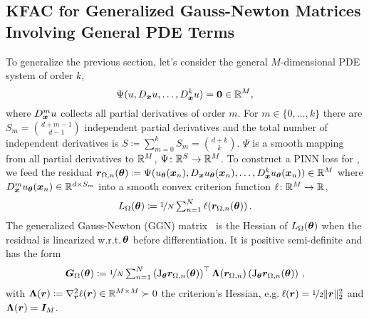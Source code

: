 \subsection{KFAC for Generalized Gauss-Newton Matrices Involving General PDE Terms} \label{sec:KFAC-general}
To generalize the previous section, let's consider the general $M$-dimensional PDE system of order $k$,
\begin{equation}\label{eq:general-pde-system}
  \Psi(u, D_{{\bm{x}}} u, \dots, D^k_{{\bm{x}}} u) = {\bm{0}} \in {\mathbb{R}}^M,
\end{equation}
where $D^m_{\bm{x}} u$ collects all partial derivatives of order $m$.
For $m\in \{0, \dots, k\}$ there are $S_m = \binom{d + m - 1}{d - 1}$ independent partial derivatives and the total number of independent derivatives is $S \coloneqq \sum_{m=0}^k S_{m} = \binom{d + k}{k}$.
$\Psi$ is a smooth mapping from all partial derivatives to ${\mathbb{R}}^M$, $\Psi\colon \mathbb {{\mathbb{R}}}^S\to\mathbb {{\mathbb{R}}}^M$.
To construct a PINN loss for , we feed the residual ${\bm{r}}_{\Omega, n}({\bm{\theta}}) \coloneqq \Psi(u_{{\bm{\theta}}}({\bm{x}}_n), D_{{\bm{x}}} u_{{\bm{\theta}}}({\bm{x}}_n), \dots, D^k_{{\bm{x}}} u_{{\bm{\theta}}}({\bm{x}}_n)) \in {\mathbb{R}}^M$ where $D^{m}_{{\bm{x}}} u_{{\bm{\theta}}}({\bm{x}}_n) \in {\mathbb{R}}^{d \times S_{m}}$ into a smooth convex criterion function $\ell\colon {\mathbb{R}}^M \to {\mathbb{R}}$,
\begin{equation}
  L_{\Omega}({\bm{\theta}})\coloneqq \nicefrac{1}{N}
  \textstyle
  \sum_{n=1}^N \ell({\bm{r}}_{\Omega,n}({\bm{\theta}}))\,.
\end{equation}
The generalized Gauss-Newton (GGN) matrix~\cite{schraudolph2002fast} is the Hessian of $L_{\Omega}({\bm{\theta}})$ when the residual is linearized w.r.t.\,${\bm{\theta}}$ before differentiation. It is positive semi-definite and has the form
\begin{align}
  {\bm{G}}_{\Omega}({\bm{\theta}})
  \coloneqq
  \nicefrac{1}{N}
  \textstyle
  \sum_{n=1}^N
  \left(\mathrm{J}_{\bm{\theta}} {\bm{r}}_{\Omega,n}({\bm{\theta}})  \right)^\top
  {\bm{\Lambda}}({\bm{r}}_{\Omega,n})
  \left(\mathrm{J}_{\bm{\theta}} {\bm{r}}_{\Omega, n}({\bm{\theta}}) \right)\,,
\end{align}
with ${\bm{\Lambda}}({\bm{r}}) \coloneqq \nabla^2_{{\bm{r}}} \ell({\bm{r}}) \in {\mathbb{R}}^{M\times M} \succ 0$ the criterion's Hessian, e.g.\,$\ell({\bm{r}}) = \nicefrac{1}{2} \lVert {\bm{r}} \rVert_2^2$ and ${\bm{\Lambda}}({\bm{r}}) = {\bm{I}}_M$.

